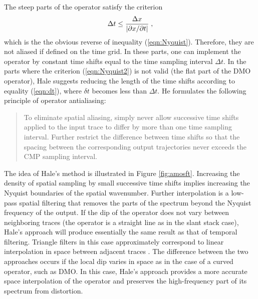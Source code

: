 The steep parts of the operator satisfy the criterion
\begin{equation}
\Delta t \leq {{\Delta x} \over {|\partial x / \partial t|}}\;,
\label{eqn:Nyquist2}
\end{equation}
which is the the obvious reverse of inequality (\ref{eqn:Nyquist}).
Therefore, they are not aliased if defined on the time grid. In these
parts, one can implement the operator by constant time shifts equal to
the time sampling interval $\Delta t$. In the parts where the
criterion (\ref{eqn:Nyquist2}) is not valid (the flat part of the DMO
operator), Hale suggests reducing the length of the time shifts
according to equality (\ref{eqn:dt}), where $\delta t$ becomes less
than $\Delta t$. He formulates the following principle of operator
antialiasing:
\begin{quote}
  To eliminate spatial aliasing, simply never allow successive time
shifts applied to the input trace to differ by more than one time
sampling interval. Further restrict the difference between time shifts
so that the spacing between the corresponding output trajectories
never exceeds the CMP sampling interval.
\end{quote}


The idea of Hale's method is illustrated in Figure \ref{fig:amosft}.
Increasing the density of spatial sampling by small successive time
shifts implies increasing the Nyquist boundaries of the spatial
wavenumber. Further interpolation is a low-pass spatial filtering that
removes the parts of the spectrum beyond the Nyquist frequency of the
output. If the dip of the operator does not vary between neighboring
traces (the operator is a straight line as in the slant stack case),
Hale's approach will produce essentially the same result as that of
temporal filtering. Triangle filters in this case approximately
correspond to linear interpolation in space between adjacent traces
\cite{Nichols.sep.77.283}. The difference between the two approaches
occurs if the local dip varies in space as in the case of a curved
operator, such as DMO. In this case, Hale's approach provides a more
accurate space interpolation of the operator and preserves the
high-frequency part of its spectrum from distortion.


